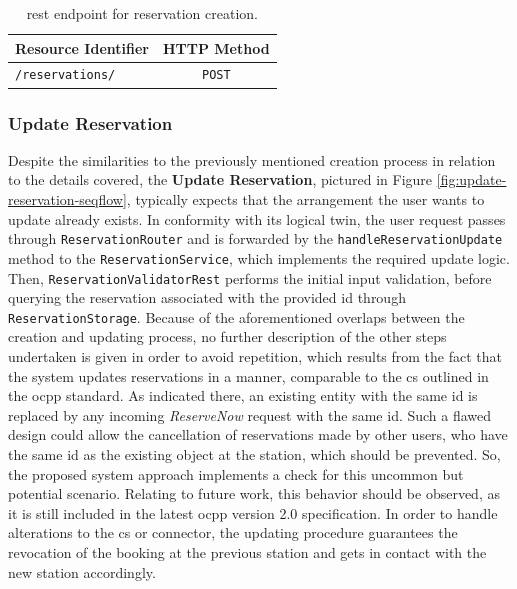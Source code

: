 \begingroup
\setlength{\tabcolsep}{10pt} %
\renewcommand{\arraystretch}{1.5} %
\begin{table}[h]
\centering
\caption{\acrshort{rest} endpoint for reservation creation.}
    \begin{tabular}{l|c}
    Resource Identifier & HTTP Method \\ \hline
    \texttt{/reservations/} & \texttt{POST} \\    
    \end{tabular}
\label{tab:create-reservation-rest}
\end{table}
\endgroup

\newpage

\subsubsection{Update Reservation}
\label{ch:Implementation:sec:Reservation System:ssec:Management Capabilities:sssec:Update Reservation}

Despite the similarities to the previously mentioned creation process in relation to the details covered, the \textbf{Update Reservation}, pictured in Figure \ref{fig:update-reservation-seqflow}, typically expects that the arrangement the user wants to update already exists.
In conformity with its logical twin, the user request passes through \texttt{ReservationRouter} and is forwarded by the \texttt{handleReservationUpdate} method to the \texttt{ReservationService}, which implements the required update logic.
Then, \texttt{ReservationValidatorRest} performs the initial input validation, before querying the reservation associated with the provided \acrshort{id} through \\ \texttt{ReservationStorage}.
Because of the aforementioned overlaps between the creation and updating process, no further description of the other steps undertaken is given in order to avoid repetition, which results from the fact that the system updates reservations in a manner, comparable to the \acrshort{cs} outlined in the \acrshort{ocpp} standard.
As indicated there, an existing entity with the same \acrshort{id} is replaced by any incoming \textit{ReserveNow} request with the same \acrshort{id}.  
Such a flawed design could allow the cancellation of reservations made by other users, who have the same \acrshort{id} as the existing object at the station, which should be prevented. So, the proposed system approach implements a check for this uncommon but potential scenario.
Relating to future work, this behavior should be observed, as it is still included in the latest \acrshort{ocpp} version 2.0 specification.
In order to handle alterations to the \acrshort{cs} or connector, the updating procedure guarantees the revocation of the booking at the previous station and gets in contact with the new station accordingly.

